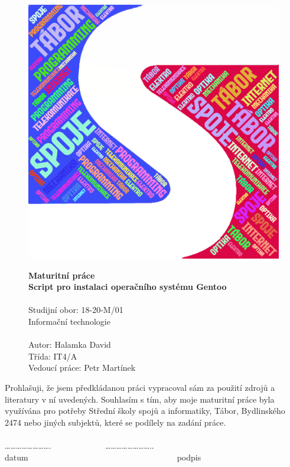 \documentclass[12pt,a4paper,twoside,]{article}
\begin{document}
\begin{figure}[h!]
\centering
\includegraphics[scale=0.5,]{obrazky/sssi_logo.png}


	
\textsf{\textbf{\Huge Maturitní práce\\}}
\textsf{ \textbf{\Huge Script pro instalaci operačního systému Gentoo \\}}
\textsf{ \Huge \\Studijní obor: 18-20-M/01 \\Informační technologie\\}
\textsf{\LARGE \\Autor: Halamka David\\
Třída: IT4/A\\
Vedoucí práce: Petr Martínek
}
\thispagestyle{empty}
\end{figure}


\newpage
\thispagestyle{empty}
Prohlašuji, že jsem předkládanou práci vypracoval sám za použití zdrojů a literatury v ní uvedených. Souhlasím s tím, aby moje maturitní práce byla využívána pro potřeby Střední školy spojů a informatiky, Tábor, Bydlinského 2474 nebo jiných subjektů, které se podílely na zadání práce.\\ 
\\	…………………….~~~~~~~~~~~~~……………………..\\
datum~~~~~~~~~~~~~~~~~~~~~~~~~~~~~~~~~~~~podpis
\end{document}
